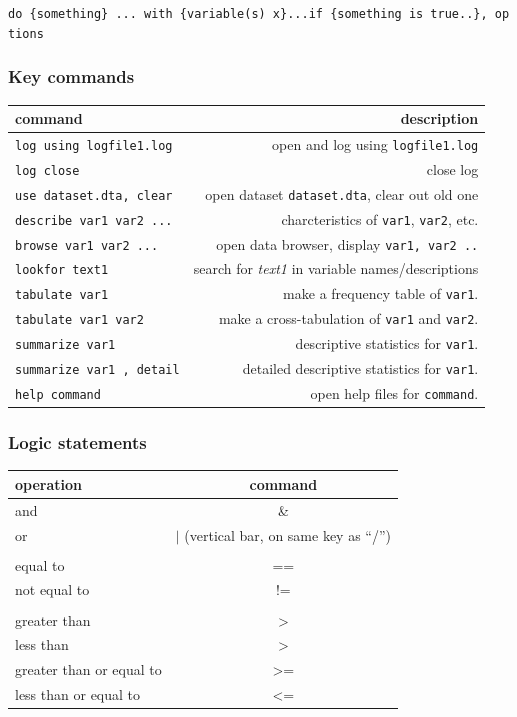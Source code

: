 \documentclass[11pt]{article}
\begin{document}
\texttt{do\ \{something\}\ ...\ with\ \{variable(s)\ x\}...if\ \{something\ is\ true..\},\ options}

\hypertarget{key-commands}{%
\subsubsection*{Key commands}\label{key-commands}}

\begin{longtable}[]{@{}lr@{}}
\toprule
command & description \\
\midrule
\endhead
\texttt{log\ using\ logfile1.log} & open and log using
\texttt{logfile1.log} \\
\texttt{log\ close} & close log \\
\texttt{use\ dataset.dta,\ clear} & open dataset \texttt{dataset.dta},
clear out old one \\
\texttt{describe\ var1\ var2\ ...} & charcteristics of \texttt{var1},
\texttt{var2}, etc. \\
\texttt{browse\ var1\ var2\ ...} & open data browser, display
\texttt{var1,\ var2\ ..} \\
\texttt{lookfor\ text1} & search for \emph{text1} in variable
names/descriptions \\
\texttt{tabulate\ var1} & make a frequency table of \texttt{var1}. \\
\texttt{tabulate\ var1\ var2} & make a cross-tabulation of \texttt{var1}
and \texttt{var2}. \\
\texttt{summarize\ var1} & descriptive statistics for \texttt{var1}. \\
\texttt{summarize\ var1\ ,\ detail} & detailed descriptive statistics
for \texttt{var1}. \\
\texttt{help\ command} & open help files for \texttt{command}. \\
\bottomrule
\end{longtable}

\hypertarget{logic-statements}{%
\subsubsection*{Logic statements}\label{logic-statements}}

\begin{longtable}[]{@{}lc@{}}
\toprule
operation & command \\
\midrule
\endhead
and & \& \\
or & \(|\) (vertical bar, on same key as ``/'') \\
& \\
equal to & == \\
not equal to & != \\
& \\
greater than & \textgreater{} \\
less than & \textgreater{} \\
greater than or equal to & \textgreater= \\
less than or equal to & \textless= \\
\bottomrule
\end{longtable}
\end{document}
